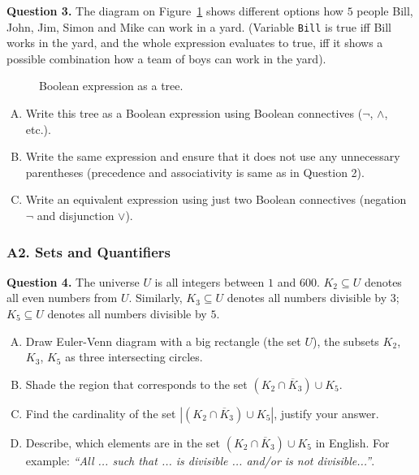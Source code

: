 \documentclass[jou]{apa6}
\begin{document}
\vspace{6pt}
{\bf Question 3.} The diagram on Figure~\ref{fig:midterm-syntax-tree} shows different options how 
$5$ people \textendash{} Bill, John, Jim, Simon and Mike \textendash{} can 
work in a yard. (Variable {\tt Bill} is true iff Bill works in the yard, 
and the whole expression evaluates to true, iff it shows a possible combination
how a team of boys can work in the yard). 

\begin{figure}[!htb]
\caption{\label{fig:midterm-syntax-tree} Boolean expression as a tree.}
\end{figure}

\begin{enumerate}[(A)]
\item Write this tree as a Boolean expression using 
Boolean connectives ($\neg$, $\wedge$, etc.).
\item Write the same expression and ensure that it does not 
use any unnecessary parentheses (precedence and associativity is 
same as in Question 2). 
\item Write an equivalent expression using just two Boolean 
connectives (negation $\neg$ and disjunction $\vee$). 
\end{enumerate}


\subsubsection{A2. Sets and Quantifiers}

{\bf Question 4.} 
The universe $U$ is all integers between $1$ and $600$. 
$K_2 \subseteq U$ denotes all even numbers from $U$.
Similarly, $K_3 \subseteq U$ denotes all numbers divisible by $3$; 
$K_5 \subseteq U$ denotes all numbers divisible by $5$. 

\begin{enumerate}[(A)]
\item Draw Euler-Venn diagram with a big rectangle (the set $U$), 
the subsets $K_2$, $K_3$, $K_5$ as three intersecting circles.
\item Shade the region that corresponds to the set
$(K_2 \cap \overline K_3) \cup K_5$. 
\item Find the cardinality of the set
$\left| (K_2 \cap \overline K_3) \cup K_5 \right|$, 
justify your answer. 
\item Describe, which elements are in the set 
$(K_2 \cap \overline K_3) \cup K_5$ in English. 
For example: {\em ``All ... such that ... is divisible ... 
and/or is not divisible...''}. 
\end{enumerate}
\end{document}
